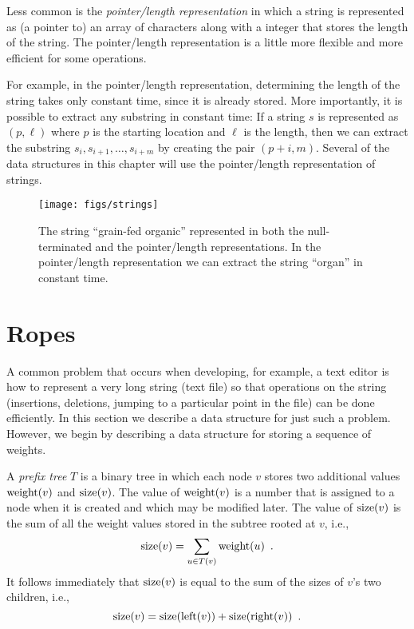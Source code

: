 Less common is the \emph{pointer/length representation} in which a
string is represented as (a pointer to) an array of characters along
with a integer that stores the length of the string.  The pointer/length
representation is a little more flexible and more efficient for some
operations.

For example, in the pointer/length representation, determining the length
of the string takes only constant time, since it is already stored.  More
importantly, it is possible to extract any substring in constant time:
If a string $s$ is represented as $(p,\ell)$ where $p$ is the starting
location and $\ell$ is the length, then we can extract the substring
$s_i,s_{i+1},\ldots,s_{i+m}$ by creating the pair $(p+i,m)$.  Several of
the data structures in this chapter will use the pointer/length representation of strings.

\begin{figure}
  \begin{center}
    \texttt{[image: figs/strings]}
  \end{center}
  \caption{The string ``grain-fed organic'' represented in both the null-terminated and the pointer/length representations.  In the pointer/length representation we can extract the string ``organ'' in constant time.}
\end{figure}

\section{Ropes}

A common problem that occurs when developing, for example, a text
editor is how to represent a very long string (text file) so that
operations on the string (insertions, deletions, jumping to a
particular point in the file) can be done efficiently.  In this
section we describe a data structure for just such a problem.
However, we begin by describing a data structure for storing a
sequence of weights.

A \emph{prefix tree} $T$ is a binary tree in which each node $v$
stores two additional values $\mathrm{weight}(v)$ and $\mathrm{size}(v)$. The value of
$\mathrm{weight}(v)$ is a number that is assigned to a node when it is created
and which may be modified later.  The value of $\mathrm{size}(v)$ is the sum of
all the weight values stored in the subtree rooted at $v$, i.e.,
\[
   \mathrm{size}(v) = \sum_{u\in T(v)} \mathrm{weight}(u) \enspace .
\]
It follows immediately that $\mathrm{size}(v)$ is equal to the sum of the sizes
of $v$'s two children, i.e.,
\begin{equation}
   \sz(v) = \sz(\lft(v)) + \sz(\rght(v)) \enspace . \eqlabel{size}
\end{equation}

